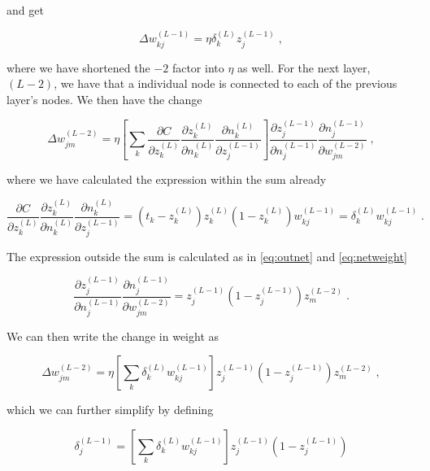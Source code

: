 and get

\begin{equation}
    \Delta w_{kj}^{(L-1)} = \eta \delta_k^{(L)} z_j^{(L-1)}  \; ,
\end{equation}

where we have shortened the $-2$ factor into $\eta$ as well. For the next layer, $(L-2)$, we have that a individual node is connected to each of the previous layer's nodes. We then have the change

\begin{equation}
    \Delta w_{jm}^{(L-2)} = \eta \left [ \sum_k \frac{\partial C}{\partial z_k^{(L)}}\frac{\partial z_k^{(L)}}{\partial n_k^{(L)}} \frac{\partial n_k^{(L)}}{\partial z_j^{(L-1)}}\right ] \frac{\partial z_j^{(L-1)}}{\partial n_j^{(L-1)}} \frac{\partial n_j^{(L-1)}}{\partial w_{jm}^{(L-2)}} \; ,
\end{equation}

where we have calculated the expression within the sum already

\begin{equation}
    \frac{\partial C}{\partial z_k^{(L)}}\frac{\partial z_k^{(L)}}{\partial n_k^{(L)}} \frac{\partial n_k^{(L)}}{\partial z_j^{(L-1)}} = \left ( t_k - z_k^{(L)} \right )z_k^{(L)}\left (1-z_k^{(L)} \right ) w_{kj}^{(L-1)} = \delta_k^{(L)} w_{kj}^{(L-1)} \; . 
\end{equation}

The expression outside the sum is calculated as in \ref{eq:outnet} and \ref{eq:netweight}

\begin{equation}
     \frac{\partial z_j^{(L-1)}}{\partial n_j^{(L-1)}} \frac{\partial n_j^{(L-1)}}{\partial w_{jm}^{(L-2)}} = z_j^{(L-1)} \left ( 1 - z_j^{(L-1)} \right  ) z_m^{(L-2)} \; .
\end{equation}

We can then write the change in weight as

\begin{equation}
   \Delta w_{jm}^{(L-2)} = \eta \left [ \sum_k \delta_k^{(L)} w_{kj}^{(L-1)} \right ] z_j^{(L-1)} \left ( 1 - z_j^{(L-1)} \right  ) z_m^{(L-2)} \; ,
\end{equation}

which we can further simplify by defining

\begin{equation}
    \delta_j^{(L-1)} = \left [ \sum_k \delta_k^{(L)} w_{kj}^{(L-1)} \right ] z_j^{(L-1)} \left ( 1 - z_j^{(L-1)} \right  )
\end{equation}

